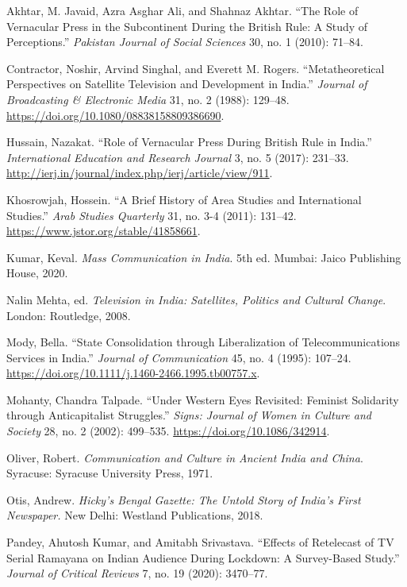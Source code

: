 \documentclass{tufte-handout}
\begin{document}
\begin{hangparas}{.25in}{1} 



Akhtar, M. Javaid, Azra Asghar Ali, and Shahnaz Akhtar. ``The Role of
Vernacular Press in the Subcontinent During the British Rule: A Study of
Perceptions.'' \emph{Pakistan Journal of Social Sciences} 30, no. 1
(2010): 71--84.

Contractor, Noshir, Arvind Singhal, and Everett M. Rogers.
``Metatheoretical Perspectives on Satellite Television and Development
in India.'' \emph{Journal of Broadcasting \& Electronic Media} 31, no. 2
(1988): 129--48. \url{https://doi.org/10.1080/08838158809386690}.

Hussain, Nazakat. ``Role of Vernacular Press During British Rule in
India.'' \emph{International Education and Research Journal} 3, no. 5
(2017): 231--33.
\url{http://ierj.in/journal/index.php/ierj/article/view/911}.

Khosrowjah, Hossein. ``A Brief History of Area Studies and International
Studies.'' \emph{Arab Studies Quarterly} 31, no. 3-4 (2011): 131--42.
\href{h\%20https://www.jstor.org/stable/41858661}{https://www.jstor.org/stable/41858661}.

Kumar, Keval. \emph{Mass Communication in India}. 5th ed. Mumbai: Jaico
Publishing House, 2020.

Nalin Mehta, ed. \emph{Television in India: Satellites, Politics and
Cultural Change}. London: Routledge, 2008.

Mody, Bella. ``State Consolidation through Liberalization of
Telecommunications Services in India.'' \emph{Journal of Communication}
45, no. 4 (1995): 107--24.
\url{https://doi.org/10.1111/j.1460-2466.1995.tb00757.x}.

Mohanty, Chandra Talpade. ``Under Western Eyes Revisited: Feminist
Solidarity through Anticapitalist Struggles.'' \emph{Signs: Journal of
Women in Culture and Society} 28, no. 2 (2002): 499--535.
\url{https://doi.org/10.1086/342914}.

Oliver, Robert. \emph{Communication and Culture in Ancient India and
China}. Syracuse: Syracuse University Press, 1971.

Otis, Andrew. \emph{Hicky's Bengal Gazette: The Untold Story of India's
First Newspaper.} New Delhi: Westland Publications, 2018.

Pandey, Ahutosh Kumar, and Amitabh Srivastava. ``Effects of Retelecast
of TV Serial Ramayana on Indian Audience During Lockdown: A Survey-Based
Study.'' \emph{Journal of Critical Reviews} 7, no. 19 (2020): 3470--77.


\end{hangparas}
\end{document}
